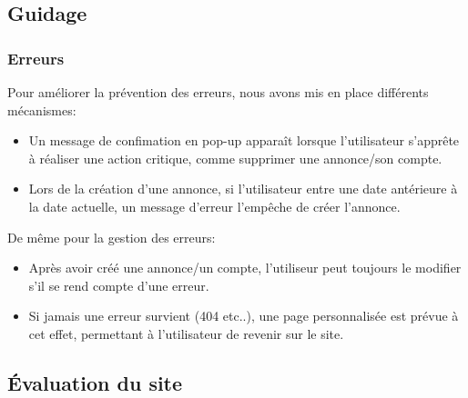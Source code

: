 \documentclass[a4paper,11pt]{article}
\begin{document}
\subsection{Guidage}
\subsubsection*{Erreurs}
Pour améliorer la prévention des erreurs, nous avons mis en place différents mécanismes:
\begin{itemize}
  \item Un message de confimation en pop-up apparaît lorsque l'utilisateur s'apprête à réaliser une action critique, comme supprimer une annonce/son compte.
  \item Lors de la création d'une annonce, si l'utilisateur entre une date antérieure à la date actuelle, un message d'erreur l'empêche de créer l'annonce.
\end{itemize}

De même pour la gestion des erreurs:
\begin{itemize}
  \item Après avoir créé une annonce/un compte, l'utiliseur peut toujours le modifier s'il se rend compte d'une erreur.
  \item Si jamais une erreur survient (404 etc..), une page personnalisée est prévue à cet effet, permettant à l'utilisateur de revenir sur le site.
\end{itemize}


\subsection{Évaluation du site}
\end{document}
